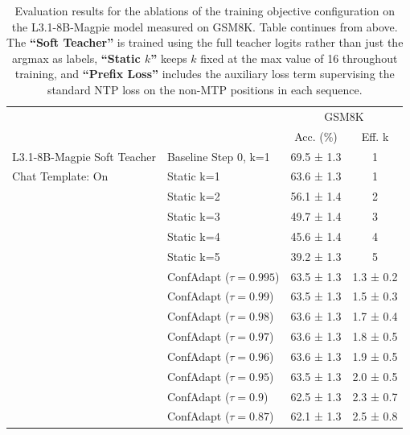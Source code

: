 \documentclass{article}
\theoremstyle{plain}
\theoremstyle{definition}
\theoremstyle{remark}
\begin{document}
\begin{table}[h!]
\small
\caption{Evaluation results for the ablations of the training objective configuration on the L3.1-8B-Magpie model measured on GSM8K. Table continues from above. The \textbf{``Soft Teacher''} is trained using the full teacher logits rather than just the argmax as labels, \textbf{``Static $k$''} keeps $k$ fixed at the max value of 16 throughout training, and \textbf{``Prefix Loss''} includes the auxiliary loss term supervising the standard NTP loss on the non-MTP positions in each sequence.}
\label{tab:abl-l3-suprv-evals-pt2}
\centering
\begin{tabular}{llcc}
\toprule
 &  & \multicolumn{2}{c}{GSM8K} \\
 &  & Acc. (\%) & Eff. k \\
\midrule
L3.1-8B-Magpie Soft Teacher & Baseline Step 0, k=1 & 69.5 ± 1.3 & 1 \\
 Chat Template: On & Static k=1 & 63.6 ± 1.3 & 1 \\
 & Static k=2 & 56.1 ± 1.4 & 2 \\
 & Static k=3 & 49.7 ± 1.4 & 3 \\
 & Static k=4 & 45.6 ± 1.4 & 4 \\
 & Static k=5 & 39.2 ± 1.3 & 5 \\
 & ConfAdapt ($\tau=0.995$) & 63.5 ± 1.3 & 1.3 ± 0.2 \\
 & ConfAdapt ($\tau=0.99$) & 63.5 ± 1.3 & 1.5 ± 0.3 \\
 & ConfAdapt ($\tau=0.98$) & 63.6 ± 1.3 & 1.7 ± 0.4 \\
 & ConfAdapt ($\tau=0.97$) & 63.6 ± 1.3 & 1.8 ± 0.5 \\
 & ConfAdapt ($\tau=0.96$) & 63.6 ± 1.3 & 1.9 ± 0.5 \\
 & ConfAdapt ($\tau=0.95$) & 63.5 ± 1.3 & 2.0 ± 0.5 \\
 & ConfAdapt ($\tau=0.9$) & 62.5 ± 1.3 & 2.3 ± 0.7 \\
 & ConfAdapt ($\tau=0.87$) & 62.1 ± 1.3 & 2.5 ± 0.8 \\

\end{tabular}
\end{table}
\end{document}
